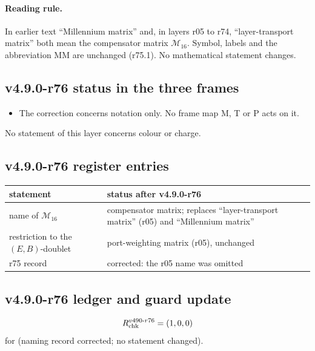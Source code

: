 \paragraph{Reading rule.}
In earlier text ``Millennium matrix'' and, in layers r05 to r74, ``layer-transport matrix'' both mean the compensator matrix
\(\mathcal M_{16}\).  Symbol, labels and the abbreviation MM are unchanged (r75.1).  No mathematical statement changes.

\subsection*{v4.9.0-r76 status in the three frames}
\label{subsec:v490-r76-frames}

\begin{itemize}[leftmargin=2em]
\item The correction concerns notation only.  No frame map M, T or P acts on it.
\end{itemize}
No statement of this layer concerns colour or charge.

\subsection*{v4.9.0-r76 register entries}
\label{subsec:v490-r76-register}

\begin{center}
\small
\begin{tabular}{@{}>{\raggedright\arraybackslash}p{}>{\raggedright\arraybackslash}p{}@{}}
\toprule
statement & status after v4.9.0-r76\\
\midrule
name of \(\mathcal M_{16}\) & compensator matrix; replaces ``layer-transport matrix'' (r05) and ``Millennium matrix''\\
restriction to the \((E,B)\)-doublet & port-weighting matrix (r05), unchanged\\
r75 record & corrected: the r05 name was omitted\\
\bottomrule
\end{tabular}
\end{center}

\subsection*{v4.9.0-r76 ledger and guard update}
\label{subsec:v490-r76-ledger-guard}

\[
R_{\rm chk}^{v490\text{-}r76}=(1,0,0)
\]
for (naming record corrected; no statement changed).

